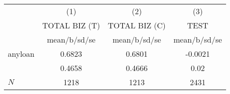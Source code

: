 {
\def\sym#1{\ifmmode^{#1}\else\(^{#1}\)\fi}
\begin{tabular}{l*{3}{c}}
\hline\hline
            &\multicolumn{1}{c}{(1)}&\multicolumn{1}{c}{(2)}&\multicolumn{1}{c}{(3)}\\
            &\multicolumn{1}{c}{TOTAL BIZ (T)}&\multicolumn{1}{c}{TOTAL BIZ (C)}&\multicolumn{1}{c}{TEST}\\
            &mean/b/sd/se&mean/b/sd/se&mean/b/sd/se\\
\hline
anyloan     &     0.6823 &     0.6801 &     -0.0021\\
            &     0.4658 &     0.4666 &        0.02\\
\hline
\(N\)       &        1218&        1213&        2431\\
\hline\hline
\end{tabular}
}
